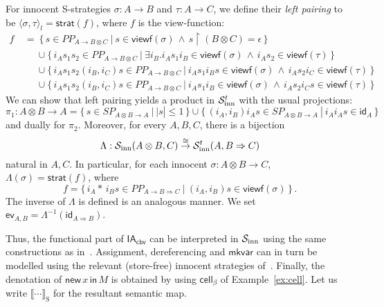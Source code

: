\documentclass{CSML}
\theoremstyle{definition}\newtheorem{definition}[thm]{Definition}
\theoremstyle{definition}\newtheorem{example}[thm]{Example}
\theoremstyle{definition}\newtheorem{proposition}[thm]{Proposition}
\theoremstyle{definition}\newtheorem{lemma}[thm]{Lemma}
\theoremstyle{definition}\newtheorem{theorem}[thm]{Theorem}
\theoremstyle{definition}\newtheorem{corollary}[thm]{Corollary}
\theoremstyle{definition}\newtheorem{remark}[thm]{Remark}
\newcommand\ev{\mathsf{ev}}
\newcommand\Scat{\mathcal{S}}
\newcommand\Scatinn{\Scat_{\rm inn}}
\newcommand\Scatinntot{\Scatinn^{t}}
\newcommand\lland{\,\land\,}
\newcommand\Arr{\Rightarrow}
\newcommand\rest{\upharpoonright}
\newcommand\ang[1]{\langle#1\rangle}
\newcommand\id{\mathsf{id}}
\newcommand\viewf{\mathsf{viewf}}
\newcommand\strat{\mathsf{strat}}
\newcommand\preplays[1]{\mathit{PP}_{#1}}
\newcommand\Splays[1]{\mathit{SP}_{#1}}
\newcommand\iacbv{\mathsf{IA}_{\mathsf{cbv}}}
\newcommand\mkvar{\mathsf{mkvar}}
\newcommand\makeset[1]{\{\,#1\,\}}
\newcommand\sem[1]{\llbracket #1 \rrbracket}
\newcommand\ssem[1]{\sem{#1}_{\mathrm{S}}}
\newcommand\new[2]{\mathsf{new}\,#1\,\mathsf{in}\,#2}
\begin{document}
For innocent S-strategies $\sigma:A\to B$ and $\tau:A\to C$, we define their \emph{left pairing} to be
$\ang{\sigma,\tau}_l= \strat(f)$, where $f$ is the view-function:
\begin{align*}
f\ &=\ \makeset{ s\in\preplays{A\to B\otimes C}\ |\ s\in \viewf(\sigma) \lland s\rest (B\otimes C)=\epsilon}
\\
&\quad\; \cup \makeset{ i_As_1s_2\in\preplays{A\to B\otimes C}\ |\ \exists i_B.i_As_1i_B\in\viewf(\sigma)\lland i_As_2\in\viewf(\tau)}
\\
&\quad\; \cup \makeset{ i_As_1s_2(i_B,i_C)s\in\preplays{A\to B\otimes C}\ |\ 
i_As_1i_Bs\in\viewf(\sigma)\lland i_As_2i_C\in\viewf(\tau)}
\\
&\quad\; \cup \makeset{ i_As_1s_2(i_B,i_C)s\in\preplays{A\to B\otimes C}\ |\ 
i_As_1i_B\in\viewf(\sigma)\lland i_As_2i_Cs\in\viewf(\tau)}
\end{align*}
We can show that left pairing yields a product in $\Scatinntot$ with the usual projections:
\[
\pi_1:A\otimes B\to A =
\makeset{s\in\Splays{A\otimes B\to A}\ |\ |s|\leq 1}\cup
\makeset{(i_A,i_B)i_As\in\Splays{A\otimes B\to A}\ |\ i_Ai_As\in\id_{A}}
\]
and dually for $\pi_2$.
Moreover, for every $A,B,C$, there is a bijection
\[
\Lambda:\Scatinn(A\otimes B,C)\overset{\cong}{\to}\Scatinntot(A,B\Rightarrow C)
\]
natural in $A,C$. In particular, for each innocent $\sigma:A\otimes B\to C$, $\Lambda(\sigma)=\strat(f)$, where
\[
f=
\makeset{i_A{*}\,i_Bs\in\preplays{A\to B\Rightarrow C}\ |\ (i_A,i_B)s\in\viewf(\sigma)}\,.
\]
The inverse of $\Lambda$ is defined is an analogous manner. We set $\ev_{A,B}=\Lambda^{-1}(\id_{A\Arr B})$.

Thus, the functional part of $\iacbv$ can be interpreted in $\Scatinn$ using the same constructions as in~\cite{HY97}.
Assignment, dereferencing and $\mkvar$ can in turn be modelled using
the relevant (store-free) innocent strategies of~\cite{AM97b}. 
Finally, the denotation of $\new{x}{M}$ is obtained by using $\mathsf{cell}_\beta$ of Example~\ref{ex:cell}.
Let us write $\ssem{\cdots}$ for the resultant semantic map.
\end{document}
